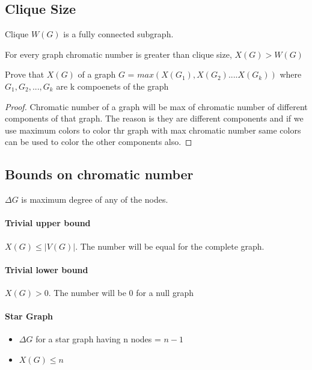 \subsection{Clique Size}
Clique $W(G)$ is a fully connected subgraph. 



For every graph chromatic number is greater than clique size, $X(G) > W(G)$

\begin{theorem} Prove that $X(G)$ of a graph $G$ = $max(X(G_1), X(G_2) .... X(G_k))$ where $G_1, G_2,..., G_k$ are k compoenets of the graph
\end{theorem}
\begin{proof}
Chromatic number of a graph will be max of chromatic number of different components of that graph. 
The reason is they are different components and if we use maximum colors to color thr graph with max chromatic number same colors can be used to color the other components also. 
\end{proof}

\subsection{Bounds on chromatic number}
$\Delta G$ is maximum degree of any of the nodes.


\paragraph{Trivial upper bound} $X(G) \leq |V(G)|$. The number will be equal for the complete graph.
\paragraph{Trivial lower bound} $X(G) > 0$. The number will be 0 for a null graph



\paragraph{Star Graph}
\begin{itemize}
    \item $\Delta G$ for a star graph having n nodes = $n-1$
    \item $X(G) \leq n$
\end{itemize}


